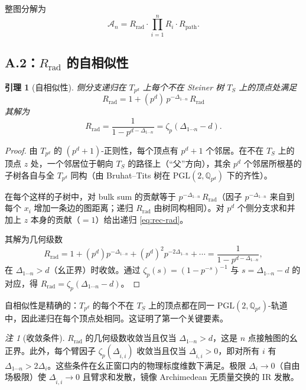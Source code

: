 \documentclass[11pt,a4paper]{ctexart}
\newtheorem{lemma}[theorem]{引理}
\theoremstyle{remark}
\newtheorem{remark}[theorem]{注}
\newcommand{\PGL}{\mathrm{PGL}}
\newcommand{\BirTits}{Bruhat--Tits}
\begin{document}
整图分解为
\begin{equation}
\label{eq:factorization}
\mathcal{A}_n = R_{\mathrm{rad}} \cdot \prod_{i=1}^n R_i \cdot R_{\mathrm{path}}.
\end{equation}

\subsection{A.2：$R_{\mathrm{rad}}$ 的自相似性}

\begin{lemma}[自相似性]
\label{lem:self-sim}
侧分支递归在 $T_{p^d}$ 上每个不在 Steiner 树 $T_S$ 上的顶点处满足
\begin{equation}
R_{\mathrm{rad}} = 1 + (p^d) \, p^{-\Delta_{1\cdots n}} \, R_{\mathrm{rad}}
\end{equation}
其解为
\begin{equation}
R_{\mathrm{rad}} = \frac{1}{1 - p^{d - \Delta_{1\cdots n}}} = \zeta_p(\Delta_{1\cdots n} - d).
\end{equation}
\end{lemma}

\begin{proof}
由 $T_{p^d}$ 的 $(p^d{+}1)$-正则性，每个顶点有 $p^d{+}1$ 个邻居。在不在 $T_S$ 上的顶点 $z$ 处，一个邻居位于朝向 $T_S$ 的路径上（``父''方向），其余 $p^d$ 个邻居所根基的子树各自与全 $T_{p^d}$ 同构（由 \BirTits{} 树在 $\PGL(2, \mathbb{Q}_{p^d})$ 下的齐性）。

在每个这样的子树中，对 bulk sum 的贡献等于 $p^{-\Delta_{1\cdots n}} \, R_{\mathrm{rad}}$（因子 $p^{-\Delta_{1\cdots n}}$ 来自到每个 $x_i$ 增加一条边的图距离；递归 $R_{\mathrm{rad}}$ 由树同构相同）。对 $p^d$ 个侧分支求和并加上 $z$ 本身的贡献（$=1$）给出递归 \eqref{eq:rec-rad}。

其解为几何级数
\begin{equation}
R_{\mathrm{rad}} = 1 + (p^d) p^{-\Delta_{1\cdots n}} + (p^d)^2 p^{-2\Delta_{1\cdots n}} + \cdots = \frac{1}{1 - p^{d - \Delta_{1\cdots n}}},
\end{equation}
在 $\Delta_{1\cdots n} > d$（幺正界）时收敛。通过 $\zeta_p(s) = (1 - p^{-s})^{-1}$ 与 $s = \Delta_{1\cdots n} - d$ 的对应，得 $R_{\mathrm{rad}} = \zeta_p(\Delta_{1\cdots n} - d)$。\qedhere
\end{proof}

自相似性是精确的：$T_{p^d}$ 的每个不在 $T_S$ 上的顶点都在同一 $\PGL(2, \mathbb{Q}_{p^d})$-轨道中，因此递归在每个顶点处相同。这证明了第一个关键要素。

\begin{remark}[收敛条件]
\label{rem:convergence}
$R_{\mathrm{rad}}$ 的几何级数收敛当且仅当 $\Delta_{1\cdots n} > d$，这是 $n$ 点接触图的幺正界。此外，每个臂因子 $\zeta_p(\Delta_{\hat{i},i})$ 收敛当且仅当 $\Delta_{\hat{i},i} > 0$，即对所有 $i$ 有 $\Delta_{1\cdots n} > 2\Delta_i$。这些条件在幺正窗口内的物理标度维数下满足。极限 $\Delta_i \to 0$（自由场极限）使 $\Delta_{\hat{i},i} \to 0$ 且臂求和发散，镜像 Archimedean 无质量交换的 IR 发散。
\end{remark}
\end{document}
